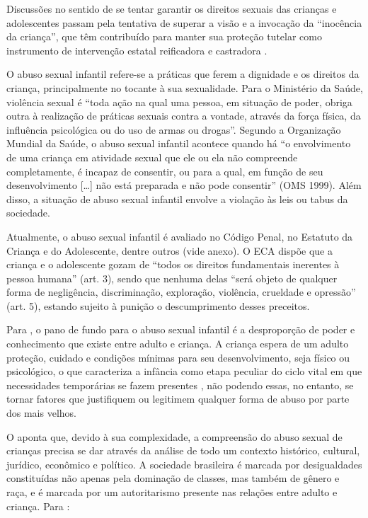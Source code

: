 
Discussões no sentido de se tentar garantir os direitos sexuais das crianças e adolescentes passam pela tentativa de superar a visão e a invocação da ``inocência da criança'', que têm contribuído para manter sua proteção tutelar como instrumento de intervenção  estatal reificadora e castradora .

O abuso sexual infantil refere-se a práticas que ferem a dignidade e os direitos da criança, principalmente no tocante à sua sexualidade. Para o Ministério da Saúde, violência sexual é ``toda ação na qual uma pessoa, em situação de poder, obriga outra à realização de práticas sexuais contra a vontade, através da força física, da influência psicológica ou do uso de armas ou drogas''. Segundo a Organização Mundial da Saúde, o abuso sexual infantil acontece quando há ``o envolvimento de uma criança em atividade sexual que ele ou ela não compreende completamente, é incapaz de consentir, ou para a qual, em função de seu desenvolvimento [\ldots] não está preparada e não pode consentir'' (OMS 1999). Além disso, a situação de abuso sexual infantil envolve a violação às leis ou tabus da sociedade. 

Atualmente, o abuso sexual infantil é avaliado no Código Penal, no Estatuto da Criança e do Adolescente, dentre outros (vide anexo). O ECA dispõe que a criança e o adolescente gozam de ``todos os direitos fundamentais inerentes à pessoa humana''  (art. 3), sendo que nenhuma delas ``será objeto de qualquer forma de negligência, discriminação, exploração, violência, crueldade e opressão'' (art. 5), estando sujeito à punição o descumprimento desses preceitos.

Para , o pano de fundo para o abuso sexual infantil é a desproporção de poder e conhecimento que existe entre adulto e criança. A criança espera de um adulto proteção, cuidado e condições mínimas para seu desenvolvimento, seja físico ou psicológico, o que caracteriza a infância como etapa peculiar do ciclo vital em que necessidades temporárias se fazem presentes \cite{TRINDADEBREIER2007}, não podendo essas, no entanto, se tornar fatores que justifiquem ou legitimem qualquer forma de abuso por parte dos mais velhos.

O  aponta que, devido à sua complexidade, a compreensão do abuso sexual de crianças precisa se dar através da análise de todo um contexto histórico, cultural, jurídico, econômico e político. A sociedade brasileira é marcada por desigualdades constituídas não apenas pela dominação de classes, mas também de gênero e raça, e é marcada por um autoritarismo presente nas relações entre adulto e criança. Para : 

